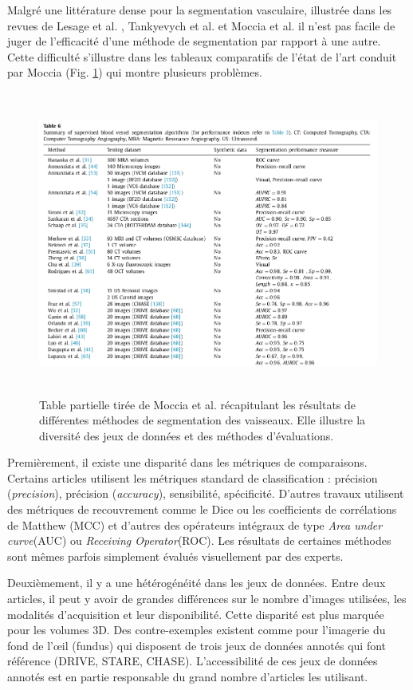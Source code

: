     Malgré une littérature dense pour la segmentation vasculaire, illustrée dans les revues de Lesage et al. \cite{Lesage2009_review}, Tankyevych et al. \cite{Tankyevych2011_angiographic} et Moccia et al. \cite{Moccia2018_survey} il n'est pas facile de juger de l'efficacité d'une méthode de segmentation par rapport à une autre. Cette difficulté s'illustre dans les tableaux comparatifs de l'état de l'art conduit par  Moccia (Fig. \ref{fig:moccia_table}) qui montre plusieurs problèmes.

    \begin{figure}[h]
      \centering
      \includegraphics[height=10cm]{Images/Moccia_example.png}
      \caption{Table partielle tirée de Moccia et al. \cite{Moccia2018_survey} récapitulant les résultats de différentes méthodes de segmentation des vaisseaux. Elle illustre la diversité des jeux de données et des méthodes d'évaluations.}
      \label{fig:moccia_table}
    \end{figure}

    Premièrement, il existe une disparité dans les métriques de comparaisons. Certains articles utilisent les métriques standard de classification : précision (\textit{precision}), précision (\textit{accuracy}), sensibilité, spécificité. D'autres travaux utilisent des métriques de recouvrement comme le Dice ou les coefficients de corrélations de Matthew (MCC) et d'autres des opérateurs intégraux de type \textit{Area under curve}(AUC) ou \textit{Receiving Operator}(ROC). Les résultats de certaines méthodes sont mêmes parfois simplement évalués visuellement par des experts.

    Deuxièmement, il y a une hétérogénéité dans les jeux de données. Entre deux articles, il peut y avoir de grandes différences sur le nombre d'images utilisées, les modalités d'acquisition et leur disponibilité. Cette disparité est plus marquée pour les volumes 3D. Des contre-exemples existent comme pour l'imagerie du fond de l'œil (fundus) qui disposent de trois jeux de données annotés qui font référence (DRIVE, STARE, CHASE). L'accessibilité de ces jeux de données annotés est en partie responsable du grand nombre d'articles les utilisant.

